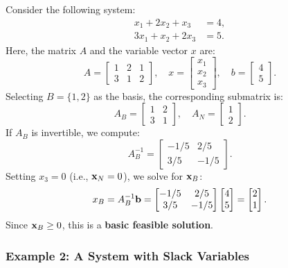 Consider the following system:
\[
\begin{aligned}
    x_1 + 2x_2 + x_3 &= 4, \\
    3x_1 + x_2 + 2x_3 &= 5.
\end{aligned}
\]
Here, the matrix \( A \) and the variable vector \( x \) are:
\[
A =
\begin{bmatrix}
    1 & 2 & 1 \\
    3 & 1 & 2
\end{bmatrix}, \quad
x =
\begin{bmatrix}
    x_1 \\ x_2 \\ x_3
\end{bmatrix}, \quad
b =
\begin{bmatrix}
    4 \\ 5
\end{bmatrix}.
\]
Selecting \(B= \{1, 2\} \) as the basis, the corresponding submatrix is:
\[
A_B =
\begin{bmatrix}
    1 & 2 \\
    3 & 1
\end{bmatrix}, \quad A_N =
\begin{bmatrix}
    1 \\
    2
\end{bmatrix}.
\]
If \( A_B \) is invertible, we compute:
\[
A_B^{-1} =
\begin{bmatrix}
    -1/5 & 2/5 \\
    3/5 & -1/5
\end{bmatrix}.
\]
Setting \( x_3 = 0 \) (i.e., \( \mathbf{x}_N = 0 \)), we solve for \( \mathbf{x}_B \):
\[
x_B = A_B^{-1}\mathbf{b}=
\begin{bmatrix}
    -1/5 & 2/5 \\
    3/5 & -1/5
\end{bmatrix}
\begin{bmatrix}
    4 \\ 5
\end{bmatrix}
=
\begin{bmatrix}
    2 \\
    1
\end{bmatrix}.
\]
Since \( \mathbf{x}_B \geq 0 \), this is a \textbf{basic feasible solution}.

\subsubsection*{Example 2: A System with Slack Variables}

